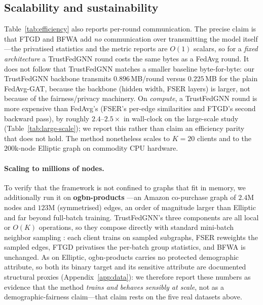 \documentclass[pdflatex,sn-mathphys-num]{sn-jnl}
\theoremstyle{thmstyleone}%
\theoremstyle{thmstyletwo}%
\theoremstyle{thmstylethree}%
\begin{document}
\subsection{Scalability and sustainability}
Table~\ref{tab:efficiency} also reports per-round communication. The precise
claim is that FTGD and BFWA add \emph{no} communication over transmitting the
model itself---the privatised statistics and the metric reports are $O(1)$
scalars, so for a \emph{fixed architecture} a TrustFedGNN round costs the same
bytes as a FedAvg round. It does not follow that TrustFedGNN matches a smaller
baseline byte-for-byte: our TrustFedGNN backbone transmits $0.896$\,MB/round
versus $0.225$\,MB for the plain FedAvg-GAT, because the backbone (hidden width,
FSER layers) is larger, not because of the fairness/privacy machinery. On
\emph{compute}, a TrustFedGNN round is more expensive than FedAvg's (FSER's
per-edge similarities and FTGD's second backward pass), by roughly
$2.4$--$2.5\times$ in wall-clock on the large-scale study
(Table~\ref{tab:large-scale}); we report this rather than claim an efficiency
parity that does not hold. The method nonetheless scales to $K{=}20$ clients and
to the $200$k-node Elliptic graph on commodity CPU hardware.

\paragraph{Scaling to millions of nodes.}
\label{sec:scaling}
To verify that the framework is not confined to graphs that fit in memory, we
additionally run it on \textbf{ogbn-products} \cite{hu2020ogb}---an Amazon
co-purchase graph of $2.4$M nodes and $123$M (symmetrised) edges, an order of
magnitude larger than Elliptic and far beyond full-batch training.
TrustFedGNN's three components are all local or $O(K)$ operations, so they
compose directly with standard mini-batch neighbor sampling
\cite{hamilton2017graphsage}: each client trains on sampled subgraphs, FSER
reweights the sampled edges, FTGD privatises the per-batch group statistics,
and BFWA is unchanged. As on Elliptic, ogbn-products carries no protected
demographic attribute, so both its binary target and its sensitive attribute
are documented structural proxies (Appendix~\ref{app:data}): we therefore
report these numbers as evidence that the method \emph{trains and behaves
sensibly at scale}, not as a demographic-fairness claim---that claim rests on
the five real datasets above.
\end{document}
